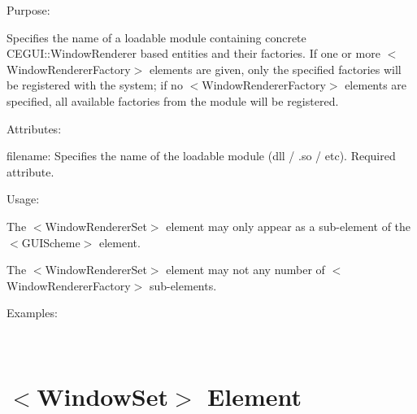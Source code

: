 \begin{DoxyItemize}
\item Purpose\+:
\begin{DoxyItemize}
\item Specifies the name of a loadable module containing concrete C\+E\+G\+U\+I\+::\+Window\+Renderer based entities and their factories. If one or more $<$Window\+Renderer\+Factory$>$ elements are given, only the specified factories will be registered with the system; if no $<$Window\+Renderer\+Factory$>$ elements are specified, all available factories from the module will be registered.
\end{DoxyItemize}
\item Attributes\+:
\begin{DoxyItemize}
\item {\ttfamily filename\+:} Specifies the name of the loadable module (dll / .so / etc). Required attribute.
\end{DoxyItemize}
\item Usage\+:
\begin{DoxyItemize}
\item The $<$Window\+Renderer\+Set$>$ element may only appear as a sub-\/element of the $<$G\+U\+I\+Scheme$>$ element.
\item The $<$Window\+Renderer\+Set$>$ element may not any number of $<$Window\+Renderer\+Factory$>$ sub-\/elements.
\end{DoxyItemize}
\item Examples\+:
\end{DoxyItemize}

~\newline
 \hypertarget{xml_scheme_xml_scheme_windowset}{}\section{$<$\+Window\+Set$>$ Element}\label{xml_scheme_xml_scheme_windowset}

